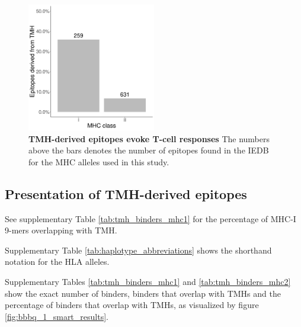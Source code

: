 \begin{figure}[!htbp]
  \centering
  \includegraphics[width=0.5\textwidth]{bbbq_article_issue_157/figure_2d.png}
  \caption{
    \textbf{
      TMH-derived epitopes evoke T-cell responses 
      }
    The numbers above the bars denotes the number of epitopes
    found in the IEDB for the MHC alleles used in this study.
  }
  \label{fig:t_cells_present_tmh_derived_epitopes}
\end{figure}

\clearpage

\subsection{Presentation of TMH-derived epitopes}

See supplementary Table \ref{tab:tmh_binders_mhc1} 
for the percentage of MHC-I 9-mers overlapping with TMH.



Supplementary Table \ref{tab:haplotype_abbreviations} shows the
shorthand notation for the HLA alleles.



Supplementary Tables \ref{tab:tmh_binders_mhc1} and \ref{tab:tmh_binders_mhc2}
show the exact number of binders, binders that overlap with TMHs
and the percentage of binders that overlap with TMHs, as
visualized by figure \ref{fig:bbbq_1_smart_results}.

\clearpage

